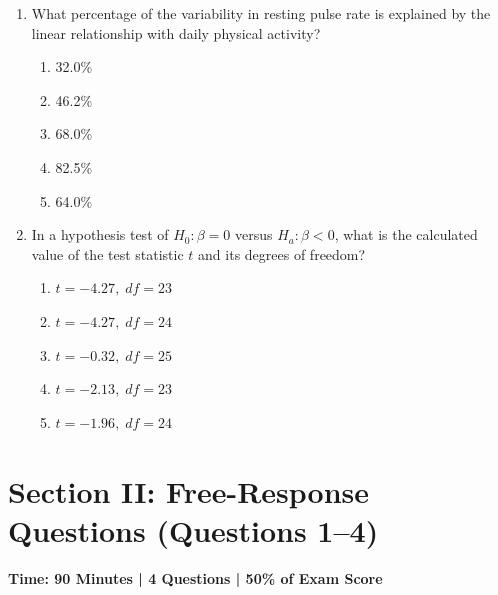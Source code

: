 \begin{enumerate}[resume, leftmargin=1.5em]
  \vspace{8pt}
  \noindent\textbf{Directions for Questions 41--42:} Use the following information to answer Questions 41 and 42.

  A public health agency studies the relationship between daily physical activity ($x$, in minutes) and resting pulse rate ($y$, in beats per minute) for a random sample of 25 adults. The least-squares regression line is $\hat{y} = 78.4 - 0.32x$, with $r = -0.68$ and standard error of the slope $\text{SE}(b_1) = 0.075$.

  \item What percentage of the variability in resting pulse rate is explained by the linear relationship with daily physical activity?
  \begin{enumerate}[label=(\Alph*)]
    \item 32.0\% \item 46.2\% \item 68.0\% \item 82.5\% \item 64.0\%
  \end{enumerate}

  \item In a hypothesis test of $H_0: \beta = 0$ versus $H_a: \beta < 0$, what is the calculated value of the test statistic $t$ and its degrees of freedom?
  \begin{enumerate}[label=(\Alph*)]
    \item $t = -4.27, \; df = 23$
    \item $t = -4.27, \; df = 24$
    \item $t = -0.32, \; df = 25$
    \item $t = -2.13, \; df = 23$
    \item $t = -1.96, \; df = 24$
  \end{enumerate}
\end{enumerate}

\section{Section II: Free-Response Questions (Questions 1--4)}
\textbf{Time: 90 Minutes | 4 Questions | 50\% of Exam Score}

